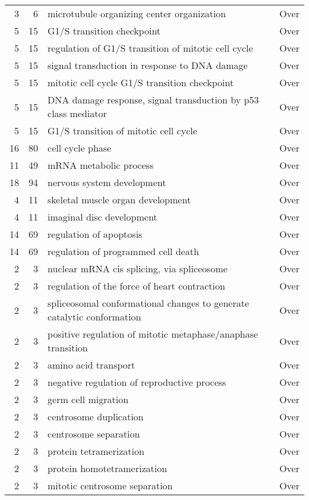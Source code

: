 \documentclass[10pt]{bmc_article}
\newenvironment{bmcformat}{\begin{raggedright}\baselineskip20pt\sloppy\setboolean{publ}{false}}{\end{raggedright}\baselineskip20pt\sloppy}
\begin{document}
\begin{bmcformat}
\begin{longtable}{rrll}
    3 &   6 & microtubule organizing center organization & Over \\ 
    5 &  15 & G1/S transition checkpoint & Over \\ 
    5 &  15 & regulation of G1/S transition of mitotic cell cycle & Over \\ 
    5 &  15 & signal transduction in response to DNA damage & Over \\ 
    5 &  15 & mitotic cell cycle G1/S transition checkpoint & Over \\ 
    5 &  15 & DNA damage response, signal transduction by p53 class mediator & Over \\ 
    5 &  15 & G1/S transition of mitotic cell cycle & Over \\ 
   16 &  80 & cell cycle phase & Over \\ 
   11 &  49 & mRNA metabolic process & Over \\ 
   18 &  94 & nervous system development & Over \\ 
    4 &  11 & skeletal muscle organ development & Over \\ 
    4 &  11 & imaginal disc development & Over \\ 
   14 &  69 & regulation of apoptosis & Over \\ 
   14 &  69 & regulation of programmed cell death & Over \\ 
    2 &   3 & nuclear mRNA cis splicing, via spliceosome & Over \\ 
    2 &   3 & regulation of the force of heart contraction & Over \\ 
    2 &   3 & spliceosomal conformational changes to generate catalytic conformation & Over \\ 
    2 &   3 & positive regulation of mitotic metaphase/anaphase transition & Over \\ 
    2 &   3 & amino acid transport & Over \\ 
    2 &   3 & negative regulation of reproductive process & Over \\ 
    2 &   3 & germ cell migration & Over \\ 
    2 &   3 & centrosome duplication & Over \\ 
    2 &   3 & centrosome separation & Over \\ 
    2 &   3 & protein tetramerization & Over \\ 
    2 &   3 & protein homotetramerization & Over \\ 
    2 &   3 & mitotic centrosome separation & Over \\ 

\end{longtable}
\end{bmcformat}
\end{document}
